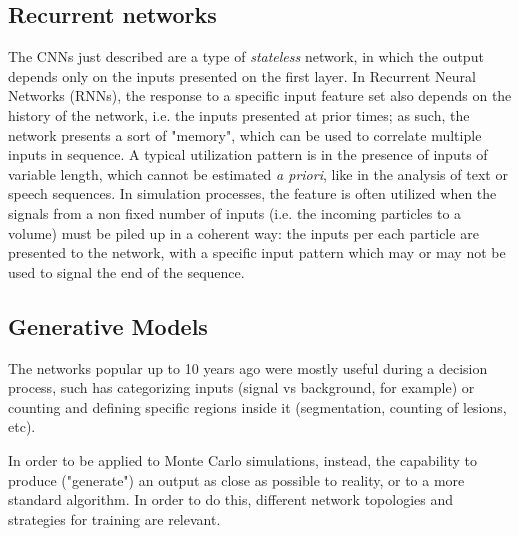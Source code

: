 \subsection{Recurrent networks}
The CNNs just described are a type of \emph{stateless} network, in which the output depends only on the inputs presented on the first layer. In Recurrent Neural Networks (RNNs), the response to a specific input feature set also depends on the history of the network, i.e. the inputs presented at prior times; as such, the network presents a sort of "memory", which can be used to correlate multiple inputs in sequence. A typical utilization pattern is in the presence of inputs of variable length, which cannot be estimated \emph{a priori}, like in the analysis of text or speech sequences. 
In simulation processes, the feature is often utilized when the signals from a non fixed number of inputs (i.e. the incoming particles to a volume) must be piled up in a coherent way: the inputs per each particle are presented to the network, with a specific input pattern which may or may not be used to signal the end of the sequence. %

\subsection{Generative Models}
\label{subseq:gan}
The networks popular up to 10 years ago were mostly useful during a decision process, such has categorizing inputs (signal vs background, for example) or counting and defining specific regions inside it (segmentation, counting of lesions, etc).

In order to be applied to Monte Carlo simulations, instead, the capability to produce ("generate") an output as close as possible to reality, or to a more standard algorithm. In order to do this, different network topologies and strategies for training are relevant.


